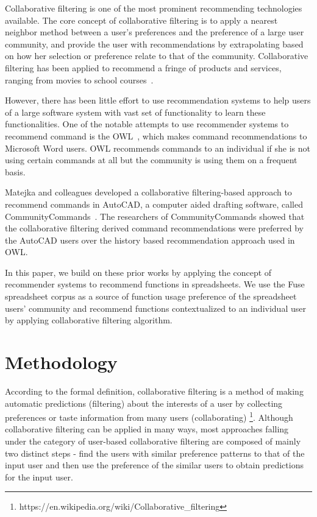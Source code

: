 \documentclass[conference]{IEEEtran}
\begin{document}
Collaborative filtering is one of the most prominent recommending technologies available. The core concept of collaborative filtering is to apply a nearest neighbor method between a user's preferences and the preference of a large user community, and provide the user with recommendations by extrapolating based on how her selection or preference relate to that of the community. Collaborative filtering has been applied to recommend a fringe of products and services, ranging from movies to school courses~\cite{miller2003movielens, resnick1994grouplens, linden2003amazon, liu2003adaptive, mcnee2006don, farzan2006social, hsu2008personalized}. 

However, there has been little effort to use recommendation systems to help users of a large   software system with vast set of functionality to learn these functionalities. One of the notable attempts to use recommender systems to recommend command is the OWL~\cite{linton2000owl}, which makes command recommendations to Microsoft Word users. OWL recommends commands to an individual if she is not using certain commands at all but the community is using them on a frequent basis.

Matejka and colleagues developed a collaborative filtering-based approach to recommend commands in AutoCAD, a computer aided drafting software, called CommunityCommands~\cite{matejka2009communitycommands}. The researchers of CommunityCommands showed that the collaborative filtering derived command recommendations were preferred by the AutoCAD users over the history based recommendation approach used in OWL.

In this paper, we build on these prior works by applying the concept of recommender systems to recommend functions in spreadsheets. We use the Fuse spreadsheet corpus as a source of function usage preference of the spreadsheet users' community and recommend functions contextualized to an individual user by applying collaborative filtering algorithm.

\section{Methodology}
According to the formal definition, collaborative filtering is a method of making automatic predictions (filtering) about the interests of a user by collecting preferences or taste information from many users (collaborating) \footnote{https://en.wikipedia.org/wiki/Collaborative\_filtering}. Although collaborative filtering can be applied in many ways, most approaches falling under the category of user-based collaborative filtering are composed of mainly two distinct steps - find the users with similar preference patterns to that of the input user and then use the preference of the similar users to obtain predictions for the input user.
\end{document}
